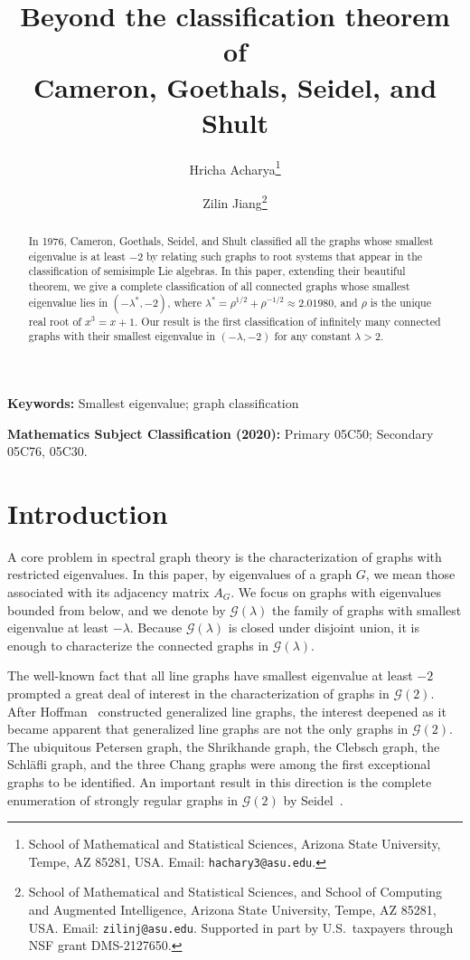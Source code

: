 \documentclass[11pt]{article}
\title{Beyond the classification theorem of\\Cameron, Goethals, Seidel, and Shult}
\author{
    Hricha Acharya\thanks{School of Mathematical and Statistical Sciences, Arizona State University, Tempe, AZ 85281, USA. Email: {\tt hachary3@asu.edu}.}
    \and Zilin Jiang\thanks{School of Mathematical and Statistical Sciences, and School of Computing and Augmented Intelligence, Arizona State University, Tempe, AZ 85281, USA. Email: {\tt zilinj@asu.edu}. Supported in part by U.S.\ taxpayers through NSF grant DMS-2127650.}
}
\date{}
\theoremstyle{definition}
\theoremstyle{remark}
\newcommand{\la}{\lambda}
\newcommand{\G}{\mathcal{G}}
\begin{document}
\maketitle

\begin{abstract}
	In 1976, Cameron, Goethals, Seidel, and Shult classified all the graphs whose smallest eigenvalue is at least $-2$ by relating such graphs to root systems that appear in the classification of semisimple Lie algebras. In this paper, extending their beautiful theorem, we give a complete classification of all connected graphs whose smallest eigenvalue lies in $(-\lambda^*, -2)$, where $\lambda^* = \rho^{1/2} + \rho^{-1/2} \approx 2.01980$, and $\rho$ is the unique real root of $x^3 = x + 1$. Our result is the first classification of infinitely many connected graphs with their smallest eigenvalue in $(-\lambda, -2)$ for any constant $\lambda > 2$.
\end{abstract}

\noindent\textbf{Keywords:} Smallest eigenvalue; graph classification

\noindent\textbf{Mathematics Subject Classification (2020):} Primary 05C50; Secondary 05C76, 05C30.

\section{Introduction} \label{sec:intro}

A core problem in spectral graph theory is the characterization of graphs with restricted eigenvalues. In this paper, by eigenvalues of a graph $G$, we mean those associated with its adjacency matrix $A_G$. We focus on graphs with eigenvalues bounded from below, and we denote by $\G(\la)$ the family of graphs with smallest eigenvalue at least $-\la$. Because $\G(\la)$ is closed under disjoint union, it is enough to characterize the connected graphs in $\G(\la)$.

The well-known fact that all line graphs have smallest eigenvalue at least $-2$ prompted a great deal of interest in the characterization of graphs in $\G(2)$. After Hoffman~\cite{H69} constructed generalized line graphs, the interest deepened as it became apparent that generalized line graphs are not the only graphs in $\G(2)$. The ubiquitous Petersen graph, the Shrikhande graph, the Clebsch graph, the Schl\"afli graph, and the three Chang graphs were among the first exceptional graphs to be identified. An important result in this direction is the complete enumeration of strongly regular graphs in $\G(2)$ by Seidel~\cite{S73}.
\end{document}
